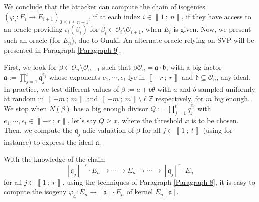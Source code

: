 \documentclass[a4paper,10pt,notitlepage]{report}
\theoremstyle{definition}
\theoremstyle{plain}
\theoremstyle{definition}
\newcommand{\Z}{\mathbb{Z}}
\newcommand{\mO}{\mathcal{O}}
\renewcommand{\i}[2]{\left\llbracket #1~;~#2\right\rrbracket}
\renewcommand{\(}{\left(}
\renewcommand{\)}{\right)}
\newcommand{\mf}[1]{\mathfrak{#1}}
\begin{document}
We conclude that the attacker can compute the chain of isogenies $(\varphi_i : E_i\longrightarrow E_{i+1})_{0\leq i\leq n-1}$, if at each index $i\in\i{1}{n}$,  if they have access to an oracle providing $\iota_i(\beta_i)$ for $\beta_i\in\mO_i\setminus\mO_{i+1}$, when $E_{i}$ is given. Now, we present such an oracle (for $E_n$), due to Onuki. An alternate oracle relying on SVP will be presented in Paragraph \ref{Paragraph 9}.

First, we look for $\beta\in\mO_n\setminus\mO_{n+1}$ such that $\beta\mO_n=\mf{a}\cdot \mf{b}$, with a big factor $\mf{a}:=\prod_{j=1}^t\mf{q}_j^{e_j}$ whose exponents $e_1, \cdots, e_t$ lye in $\i{-r}{r}$ and $\mf{b}\subseteq\mO_n$, any ideal. In practice, we test different values of $\beta:=a+b\theta$ with $a$ and $b$ sampled uniformly at random in $\i{-m}{m}$ and $\i{-m}{m}\setminus\ell\Z$ respectively, for $m$ big enough. We stop when $N(\beta)$ has a big enough divisor $Q:=\prod_{j=1}^t q_j^{e_j}$ with $e_1, \cdots, e_t\in\i{-r}{r}$, let's say $Q\geq x$, where the threshold $x$ is to be chosen. Then, we compute the $\mf{q}_j$-adic valuation of $\beta$ for all $j\in\i{1}{t}$ (using \cite[Algorithm 2.3.13]{Cohen2} for instance) to express the ideal $\mf{a}$.  

With the knowledge of the chain: 
\[[\mf{q}_j]^{-r}\cdot E_n\longrightarrow \cdots \longrightarrow E_{n}\longrightarrow \cdots\longrightarrow [\mf{q}_j]^{r}\cdot E_n\]
for all $j\in\i{1}{r}$, using the techniques of Paragraph \ref{Paragraph 8}, it is easy to compute the isogeny $\varphi_{\mf{a}}:E_n\longrightarrow [\mf{a}]\cdot E_n$ of kernel $E_n[\mf{a}]$. 
\end{document}

